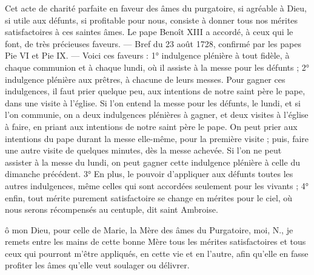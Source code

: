 \begin{notice}
Cet acte de charité parfaite en faveur des âmes du purgatoire, si agréable à Dieu, si utile aux défunts, si profitable pour nous, consiste à donner tous nos mérites satisfactoires à ces saintes âmes. Le pape Benoît XIII a accordé, à ceux qui le font, de très précieuses faveurs. — Bref du 23 août 1728, confirmé par les papes Pie VI et Pie IX. — Voici ces faveurs : 1° indulgence plénière à tout fidèle, à chaque communion et à chaque lundi, où il assiste à la messe pour les défunts ; 2° indulgence plénière aux prêtres, à chacune de leurs messes. Pour gagner ces indulgences, il faut prier quelque peu, aux intentions de notre saint père le pape, dans une visite à l’église. Si l’on entend la messe pour les défunts, le lundi, et si l’on communie, on a deux indulgences plénières à gagner, et deux visites à l’église à faire, en priant aux intentions de notre saint père le pape. On peut prier aux intentions du pape durant la messe elle-même, pour la première visite ; puis, faire une autre visite de quelques minutes, dès la messe achevée. Si l’on ne peut assister à la messe du lundi, on peut gagner cette indulgence plénière à celle du dimanche précédent. 3° En plus, le pouvoir d’appliquer aux défunts toutes les autres indulgences, même celles qui sont accordées seulement pour les vivants ; 4° enfin, tout mérite purement satisfactoire se change en mérites pour le ciel, où nous serons récompensés au centuple, dit saint Ambroise.
\end{notice}
 ô mon Dieu, pour celle de Marie, la Mère des âmes du Purgatoire, moi, N., je remets entre les mains de cette bonne Mère tous les mérites satisfactoires et tous ceux qui pourront m’être appliqués, en cette vie et en l’autre, afin qu’elle en fasse profiter les âmes qu’elle veut soulager ou délivrer.
\culdelampe